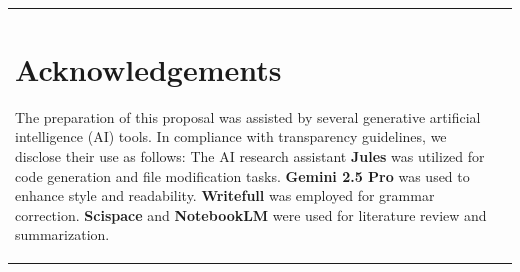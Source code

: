 \documentclass[11pt, a4paper]{article}
\begin{document}
\begin{longtable}{| p{} | p{} |}
\begin{itemize}




\section*{Acknowledgements}
The preparation of this proposal was assisted by several generative artificial intelligence (AI) tools. In compliance with transparency guidelines, we disclose their use as follows: The AI research assistant \textbf{Jules} was utilized for code generation and file modification tasks. \textbf{Gemini 2.5 Pro} was used to enhance style and readability. \textbf{Writefull} was employed for grammar correction. \textbf{Scispace} and \textbf{NotebookLM} were used for literature review and summarization.


\end{itemize}
\end{longtable}
\end{document}
